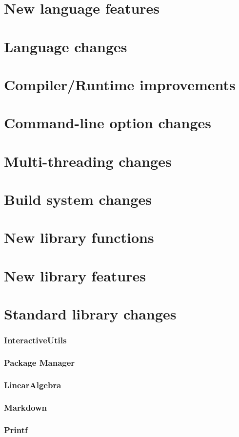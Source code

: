 \chapter{New language features}
\chapter{Language changes}
\chapter{Compiler/Runtime improvements}
\chapter{Command-line option changes}
\chapter{Multi-threading changes}
\chapter{Build system changes}
\chapter{New library functions}
\chapter{New library features}
\chapter{Standard library changes}
    \subsection{InteractiveUtils}
    \subsection{Package Manager}
    \subsection{LinearAlgebra}
    \subsection{Markdown}
    \subsection{Printf}
